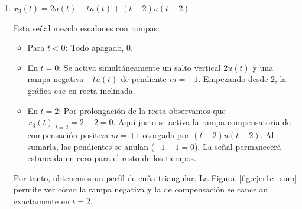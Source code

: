 \documentclass[10pt,a4paper]{article}
\begin{document}
\begin{enumerate}[label=\textbf{\alph*)}]
        Aquí observamos términos cruzados proporcionales a $t$. Es útil advertir que $t \cdot u(t)$ conforma una recta analítica enventanada que inicia en $t=0$. Adicionalmente $(t-1) \cdot u(t-1)$ es otra rampa estándar geométrica retrasada a $t=1$. El último término es un escalón convencional retrasado a $t=3$. Reconstruyendo por tramos:
		\begin{itemize}
		    \item Para $t<0$: Todo apagado, $x_2(t)=0$.
		    \item En $t=0$: Se enciende la rampa $tu(t)$. La señal empieza a subir con pendiente $m=1$.
		    \item En $t=1$: Se enciende la rampa negativa $-(t-1)u(t-1)$ sumando una pendiente parcial $m=-1$. La pendiente total resultante es $1 - 1 = 0$, por lo que a partir de aquí la función queda nivelada horizontalmente constante en el valor alcanzado, $x_2(1)=1$.
		    \item En $t=3$: Se enciende el escalón negativo $-2u(t-3)$. Desde un nivel constante de $1$, descontamos un salto de $2$, por lo que la señal salta a un nivel de $-1$ manteniéndose constante indefinidamente.
		\end{itemize}
		
		La Figura~\ref{fig:ejer1b_sum} muestra cómo cada función contribuye en su propio panel antes de superponerse.

		\begin{figure}[H]
			\centering
			
			\caption{Componentes de $x_2(t)$: la rampa $tu(t)$, la rampa retardada $-(t-1)u(t-1)$, el escalón $-2u(t-3)$, y la señal resultante.}
			\label{fig:ejer1b_sum}
		\end{figure}

		\begin{figure}[H]
			\centering
			
			\caption{Gráfica temporal de $x_2(t)$.}
			\label{fig:ejer1b}
		\end{figure}

		\item \textbf{$x_3(t)=2u(t)-tu(t)+(t-2)u(t-2)$}
		
		Esta señal mezcla escalones con rampas:
		\begin{itemize}
		    \item Para $t<0$: Todo apagado, $0$.
		    \item En $t=0$: Se activa simultáneamente un salto vertical $2u(t)$ y una rampa negativa $-tu(t)$ de pendiente $m=-1$. Empezando desde $2$, la gráfica cae en recta inclinada.
		    \item En $t=2$: Por prolongación de la recta observamos que $\left. x_3(t) \right|_{t=2} = 2 - 2 = 0$. Aquí justo se activa la rampa compensatoria de compensación positiva $m=+1$ otorgada por $(t-2)u(t-2)$. Al sumarla, las pendientes se anulan ($-1+1=0$). La señal permanecerá estancada en cero para el resto de los tiempos.
		\end{itemize}
        Por tanto, obtenemos un perfil de cuña triangular. La Figura~\ref{fig:ejer1c_sum} permite ver cómo la rampa negativa y la de compensación se cancelan exactamente en $t=2$.


\end{enumerate}
\end{document}
